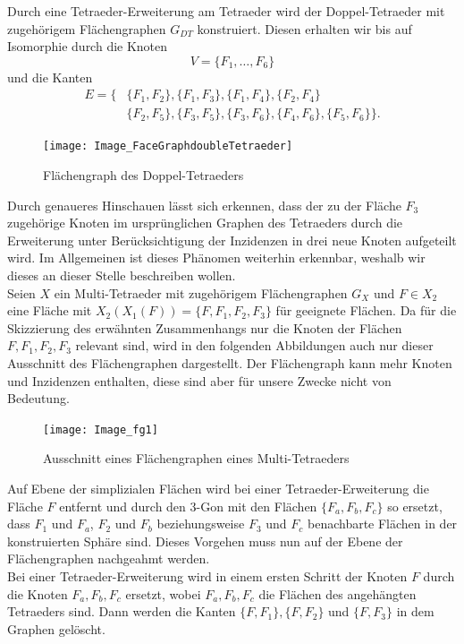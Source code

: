 \documentclass[12pt,titlepage,twoside,cleardoublepage]{article}
\theoremstyle{nummermitklammern}
\numberwithin{equation}{section}
\begin{document}
Durch eine Tetraeder-Erweiterung am Tetraeder wird der Doppel-Tetraeder mit zugehörigem Flächengraphen $G_{DT}$ konstruiert. Diesen erhalten wir bis auf Isomorphie durch die Knoten 
\[
V=\{F_1,\ldots,F_6\}
\]
 und die Kanten 
\begin{align*}
E=\{&\{F_1,F_2\},\{F_1,F_3\},\{F_1,F_4\},\{F_2,F_4\}\\
&\{F_2,F_5\},\{F_3,F_5\},\{F_3,F_6\},\{F_4,F_6\},\{F_5,F_6\}\}.
\end{align*}
\begin{figure}[H]
\begin{center}
\texttt{[image: Image\_FaceGraphdoubleTetraeder]}
\end{center}
\caption{Flächengraph des Doppel-Tetraeders}
\end{figure}
Durch genaueres Hinschauen lässt sich erkennen, dass der zu der Fläche $F_3$ zugehörige Knoten im ursprünglichen Graphen des Tetraeders durch die Erweiterung unter Berücksichtigung der Inzidenzen in drei neue Knoten aufgeteilt wird. Im Allgemeinen ist dieses Phänomen weiterhin erkennbar, weshalb wir dieses an dieser Stelle beschreiben wollen.\\
Seien $X$ ein Multi-Tetraeder mit zugehörigem Flächengraphen $G_X$ und $F\in X_2$ eine Fläche mit $X_2(X_1(F))=\{F,F_1,F_2,F_3\}$ für geeignete Flächen. 
Da für die Skizzierung des erwähnten Zusammenhangs nur die Knoten der Flächen $F,F_1,F_2,F_3$ relevant sind, wird in den folgenden Abbildungen auch nur dieser Ausschnitt des Flächengraphen dargestellt. Der Flächengraph kann mehr Knoten und Inzidenzen enthalten, diese sind aber für unsere Zwecke nicht von Bedeutung.
\begin{figure}[H]
\begin{center}
\texttt{[image: Image\_fg1]}
\end{center}
\caption{Ausschnitt eines Flächengraphen eines Multi-Tetraeders}
\end{figure}
Auf Ebene der simplizialen Flächen wird bei einer Tetraeder-Erweiterung die Fläche $F$ entfernt und durch den 3-Gon mit den Flächen $\{F_a,F_b,F_c\}$ so ersetzt, dass $F_1$ und $F_a$, $F_2$ und $F_b$ beziehungsweise $F_3$ und $F_c$ benachbarte Flächen in der konstruierten Sphäre sind. Dieses Vorgehen muss nun auf der Ebene der Flächengraphen nachgeahmt werden.\\
Bei einer Tetraeder-Erweiterung wird in einem ersten Schritt der Knoten $F$ durch die Knoten $F_a,F_b,F_c$ ersetzt, wobei $F_a,F_b,F_c$ die Flächen des angehängten Tetraeders sind. Dann werden die Kanten $\{F,F_1\},\{F,F_2\}$ und $\{F,F_3\}$ in dem Graphen gelöscht.
\end{document}
